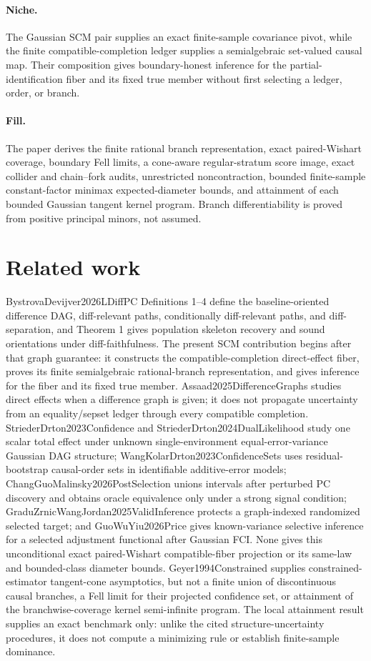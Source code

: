 \documentclass{article}
\begin{document}
\paragraph{Niche.} The Gaussian SCM pair supplies an exact finite-sample covariance pivot, while the finite compatible-completion ledger supplies a semialgebraic set-valued causal map. Their composition gives boundary-honest inference for the partial-identification fiber and its fixed true member without first selecting a ledger, order, or branch.

\paragraph{Fill.} The paper derives the finite rational branch representation, exact paired-Wishart coverage, boundary Fell limits, a cone-aware regular-stratum score image, exact collider and chain--fork audits, unrestricted noncontraction, bounded finite-sample constant-factor minimax expected-diameter bounds, and attainment of each bounded Gaussian tangent kernel program. Branch differentiability is proved from positive principal minors, not assumed.

\section{Related work}

BystrovaDevijver2026LDiffPC Definitions 1--4 define the baseline-oriented difference DAG, diff-relevant paths, conditionally diff-relevant paths, and diff-separation, and Theorem 1 gives population skeleton recovery and sound orientations under diff-faithfulness. The present SCM contribution begins after that graph guarantee: it constructs the compatible-completion direct-effect fiber, proves its finite semialgebraic rational-branch representation, and gives inference for the fiber and its fixed true member. Assaad2025DifferenceGraphs studies direct effects when a difference graph is given; it does not propagate uncertainty from an equality/sepset ledger through every compatible completion. StriederDrton2023Confidence and StriederDrton2024DualLikelihood study one scalar total effect under unknown single-environment equal-error-variance Gaussian DAG structure; WangKolarDrton2023ConfidenceSets uses residual-bootstrap causal-order sets in identifiable additive-error models; ChangGuoMalinsky2026PostSelection unions intervals after perturbed PC discovery and obtains oracle equivalence only under a strong signal condition; GraduZrnicWangJordan2025ValidInference protects a graph-indexed randomized selected target; and GuoWuYiu2026Price gives known-variance selective inference for a selected adjustment functional after Gaussian FCI. None gives this unconditional exact paired-Wishart compatible-fiber projection or its same-law and bounded-class diameter bounds. Geyer1994Constrained supplies constrained-estimator tangent-cone asymptotics, but not a finite union of discontinuous causal branches, a Fell limit for their projected confidence set, or attainment of the branchwise-coverage kernel semi-infinite program. The local attainment result supplies an exact benchmark only: unlike the cited structure-uncertainty procedures, it does not compute a minimizing rule or establish finite-sample dominance.
\end{document}

